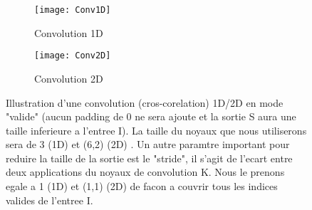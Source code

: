 \begin{figure}[!h]
\begin{subfigure}{.5\textwidth}
  \centering
  \texttt{[image: Conv1D]}  
  \caption[Conv1D]{Convolution 1D \parencite{Reference10}}
\end{subfigure}
\begin{subfigure}{.5\textwidth}
  \centering
  \texttt{[image: Conv2D]}  
  \caption[Conv2D]{Convolution 2D \parencite{Reference11}}
\end{subfigure}
\label{fig:Conv1D2D}

\centering
\decoRule
\caption[Convolution1D2D]{Illustration d'une convolution (cros-corelation) 1D/2D en mode "valide" (aucun padding de 0 ne sera ajoute et la sortie S aura une taille inferieure a l'entree I). La taille du noyaux que nous utiliserons sera de 3 (1D) et (6,2) (2D) . Un autre paramtre important pour reduire la taille de la sortie est le "stride", il s'agit de l'ecart entre deux applications du noyaux de convolution K. Nous le prenons egale a 1 (1D) et (1,1) (2D) de facon a couvrir tous les indices valides de l'entree I.}
\end{figure}



% 


